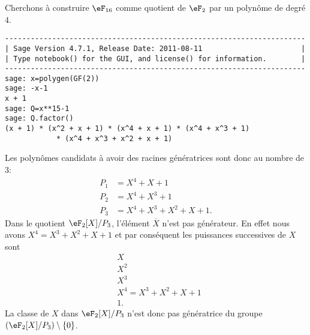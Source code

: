 \begin{example}     \label{ExemWUdrcs}
	Cherchons à construire \( \eF_{16}\) comme quotient de \( \eF_2\) par un polynôme de degré \( 4\).
	\begin{verbatim}
----------------------------------------------------------------------
| Sage Version 4.7.1, Release Date: 2011-08-11                       |
| Type notebook() for the GUI, and license() for information.        |
----------------------------------------------------------------------
sage: x=polygen(GF(2))
sage: -x-1
x + 1
sage: Q=x**15-1
sage: Q.factor()
(x + 1) * (x^2 + x + 1) * (x^4 + x + 1) * (x^4 + x^3 + 1)
            * (x^4 + x^3 + x^2 + x + 1)
    \end{verbatim}
	Les polynômes candidats à avoir des racines génératrices sont donc au nombre de \( 3\):
	\begin{subequations}
		\begin{align}
			P_1 & =X^4+X+1          \\
			P_2 & =X^4+X^3+1        \\
			P_3 & =X^4+X^3+X^2+X+1.
		\end{align}
	\end{subequations}
	Dans le quotient \( \eF_2[X]/P_3\), l'élément \( \overline X\) n'est pas générateur. En effet nous avons \( X^4=X^3+X^2+X+1\) et par conséquent les puissances successives de \( X\) sont
	\begin{subequations}
		\begin{align}
			 & X                 \\
			 & X^2               \\
			 & X^3               \\
			 & X^4  =X^3+X^2+X+1 \\
			 & 1.
		\end{align}
	\end{subequations}
	La classe de \( X\) dans \( \eF_2[X]/P_3\) n'est donc pas génératrice du groupe \( (\eF_2[X]/P_3)\setminus\{ 0 \}\).


\end{example}
